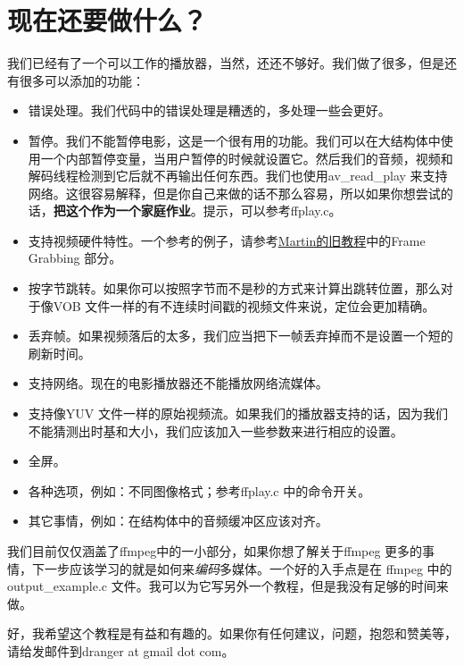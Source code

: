 ﻿\chapter*{现在还要做什么？}
\label{ch9}
我们已经有了一个可以工作的播放器，当然，还还不够好。我们做了很多，但是还有很多可以添加的功能：
\begin{itemize}
\item 错误处理。我们代码中的错误处理是糟透的，多处理一些会更好。
\item 暂停。我们不能暂停电影，这是一个很有用的功能。我们可以在大结构体中使用一个内部暂停变量，当用户暂停的时候就设置它。然后我们的音频，视频和解码线程检测到它后就不再输出任何东西。我们也使用av_read_play 来支持网络。这很容易解释，但是你自己来做的话不那么容易，所以如果你想尝试的话，\textbf{把这个作为一个家庭作业}。提示，可以参考ffplay.c。
\item 支持视频硬件特性。一个参考的例子，请参考\href{http://www.inb.uni-luebeck.de/~boehme/libavcodec_update.html}{Martin的旧教程}中的Frame Grabbing 部分。

\item 按字节跳转。如果你可以按照字节而不是秒的方式来计算出跳转位置，那么对于像VOB 文件一样的有不连续时间戳的视频文件来说，定位会更加精确。
\item 丢弃帧。如果视频落后的太多，我们应当把下一帧丢弃掉而不是设置一个短的刷新时间。
\item 支持网络。现在的电影播放器还不能播放网络流媒体。
\item 支持像YUV 文件一样的原始视频流。如果我们的播放器支持的话，因为我们不能猜测出时基和大小，我们应该加入一些参数来进行相应的设置。
\item 全屏。
\item 各种选项，例如：不同图像格式；参考ffplay.c 中的命令开关。
\item 其它事情，例如：在结构体中的音频缓冲区应该对齐。
\end{itemize}

我们目前仅仅涵盖了ffmpeg中的一小部分，如果你想了解关于ffmpeg 更多的事情，下一步应该学习的就是如何来\emph{编码}多媒体。一个好的入手点是在 ffmpeg 中的output_example.c 文件。我可以为它写另外一个教程，但是我没有足够的时间来做。

好，我希望这个教程是有益和有趣的。如果你有任何建议，问题，抱怨和赞美等，请给发邮件到dranger at gmail dot com。
